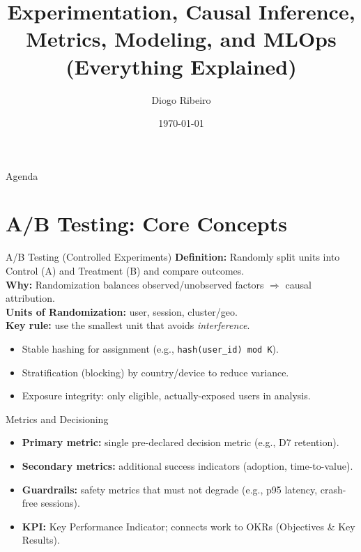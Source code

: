 \documentclass[aspectratio=169]{beamer}
\title[Experimentation \& Causal Inference]{Experimentation, Causal Inference,\\
Metrics, Modeling, and MLOps (Everything Explained)}
\author{Diogo Ribeiro}
\institute{Data Science Lead \,|\, Mathematics}
\date{\today}
\begin{document}
\begin{frame}
  \titlepage
\end{frame}

\begin{frame}{Agenda}
  \tableofcontents
\end{frame}

\section{A/B Testing: Core Concepts}
\begin{frame}{A/B Testing (Controlled Experiments)}
  \textbf{Definition:} Randomly split units into Control (A) and Treatment (B) and compare outcomes.\\[0.5em]
  \textbf{Why:} Randomization balances observed/unobserved factors $\Rightarrow$ causal attribution.\\[0.5em]
  \textbf{Units of Randomization:} user, session, cluster/geo. \\[0.25em]
  \textbf{Key rule:} use the smallest unit that avoids \emph{interference}.
  \begin{itemize}
    \item Stable hashing for assignment (e.g., \texttt{hash(user\_id) mod K}).
    \item Stratification (blocking) by country/device to reduce variance.
    \item Exposure integrity: only eligible, actually-exposed users in analysis.
  \end{itemize}
\end{frame}

\begin{frame}{Metrics and Decisioning}
  \begin{itemize}
    \item \textbf{Primary metric:} single pre-declared decision metric (e.g., D7 retention).
    \item \textbf{Secondary metrics:} additional success indicators (adoption, time-to-value).
    \item \textbf{Guardrails:} safety metrics that must not degrade (e.g., p95 latency, crash-free sessions).
    \item \textbf{KPI:} Key Performance Indicator; connects work to OKRs (Objectives \& Key Results).
  \end{itemize}
\end{frame}
\end{document}
